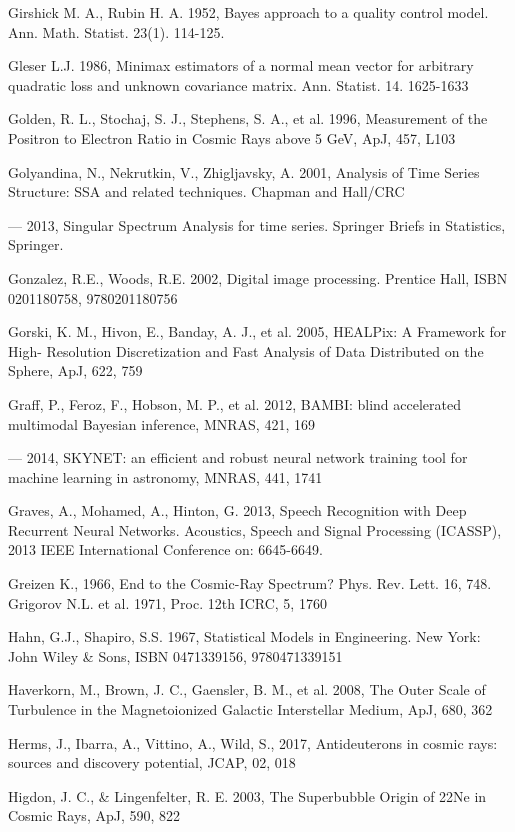 Girshick M. A., Rubin H. A. 1952, Bayes approach to a quality control model. Ann. Math. Statist. 23(1). 114-125.

Gleser L.J. 1986, Minimax estimators of a normal mean vector for arbitrary quadratic loss and unknown covariance matrix. Ann. Statist. 14. 1625-1633

Golden, R. L., Stochaj, S. J., Stephens, S. A., et al. 1996, Measurement of the Positron to Electron Ratio in Cosmic Rays above 5 GeV, ApJ, 457, L103

Golyandina, N., Nekrutkin, V., Zhigljavsky, A. 2001, Analysis of Time Series Structure: SSA and related techniques. Chapman and Hall/CRC

--- 2013, Singular Spectrum Analysis for time series. Springer Briefs in Statistics, Springer.

Gonzalez, R.E., Woods, R.E. 2002, Digital image processing. Prentice Hall, ISBN 0201180758, 9780201180756

Gorski, K. M., Hivon, E., Banday, A. J., et al. 2005, HEALPix: A Framework for High- Resolution Discretization and Fast Analysis of Data Distributed on the Sphere, ApJ, 622, 759

Graff, P., Feroz, F., Hobson, M. P., et al. 2012, BAMBI: blind accelerated multimodal Bayesian inference, MNRAS, 421, 169

--- 2014, SKYNET: an efficient and robust neural network training tool for machine learning in astronomy, MNRAS, 441, 1741

Graves, A., Mohamed, A., Hinton, G. 2013, Speech Recognition with Deep Recurrent Neural Networks. Acoustics, Speech and Signal Processing (ICASSP), 2013 IEEE International Conference on: 6645-6649.

Greizen K., 1966, End to the Cosmic-Ray Spectrum? Phys. Rev. Lett. 16, 748. Grigorov N.L. et al. 1971, Proc. 12th ICRC, 5, 1760

Hahn, G.J., Shapiro, S.S. 1967, Statistical Models in Engineering. New York: John Wiley \& Sons, ISBN 0471339156, 9780471339151

Haverkorn, M., Brown, J. C., Gaensler, B. M., et al. 2008, The Outer Scale of Turbulence in the Magnetoionized Galactic Interstellar Medium, ApJ, 680, 362

Herms, J., Ibarra, A., Vittino, A., Wild, S., 2017, Antideuterons in cosmic rays: sources and discovery potential, JCAP, 02, 018

Higdon, J. C., \& Lingenfelter, R. E. 2003, The Superbubble Origin of 22Ne in Cosmic Rays, ApJ, 590, 822

